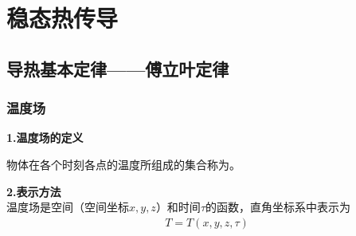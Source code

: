 \chapter{稳态热传导}
\thispagestyle{empty}
\section{导热基本定律——傅立叶定律}
\subsection{温度场}

\noindent \textbf{1.温度场的定义}

物体在各个时刻各点的温度所组成的集合称为。
\vspace*{1em}

\noindent \textbf{2.表示方法}\\
温度场是空间（空间坐标$x, y, z$）和时间$\tau$的函数，直角坐标系中表示为
\begin{align}
	T = T (x, y, z, \tau)
\end{align}

